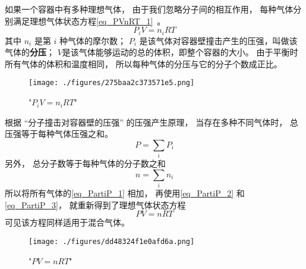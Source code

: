 

如果一个容器中有多种理想气体， 由于我们忽略分子间的相互作用， 每种气体分别满足理想气体状态方程\autoref{eq_PVnRT_1}~。
\begin{equation}\label{eq_PartiP_1}
P_i V = n_i R T
\end{equation}
其中 $n_i$ 是第 $i$ 种气体的摩尔数； $P_i$ 是该气体对容器壁撞击产生的压强，叫做该气体的\textbf{分压}； $V$是该气体能够运动的总的体积，即整个容器的大小。 由于平衡时所有气体的体积和温度相同， 所以每种气体的分压与它的分子个数成正比。

\begin{figure}[ht]
\centering
\texttt{[image: ./figures/275baa2c373571e5.png]}
\caption{"$P_i V = n_i R T$"} \label{fig_PartiP_1}
\end{figure}

根据 “分子撞击对容器壁的压强” 的压强产生原理， 当存在多种不同气体时， 总压强等于每种气体压强之和。
\begin{equation}\label{eq_PartiP_2}
P = \sum_i P_i
\end{equation}
另外， 总分子数等于每种气体的分子数之和
\begin{equation}\label{eq_PartiP_3}
n = \sum_i n_i
\end{equation}
所以将所有气体的\autoref{eq_PartiP_1} 相加， 再使用\autoref{eq_PartiP_2} 和\autoref{eq_PartiP_3}， 就重新得到了理想气体状态方程
\begin{equation}
P V = n RT
\end{equation}
可见该方程同样适用于混合气体。

\begin{figure}[ht]
\centering
\texttt{[image: ./figures/dd48324f1e0afd6a.png]}
\caption{"$P V = n RT$"} \label{fig_PartiP_2}
\end{figure}

